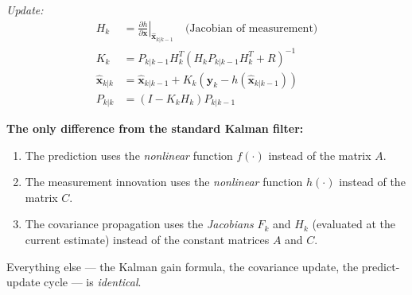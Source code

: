 \textit{Update:}
\begin{align}
H_k &= \left.\frac{\partial h}{\partial \mathbf{x}}\right|_{\hat{\mathbf{x}}_{k|k-1}} \quad \text{(Jacobian of measurement)} \\
K_k &= P_{k|k-1} H_k^T (H_k P_{k|k-1} H_k^T + R)^{-1} \\
\hat{\mathbf{x}}_{k|k} &= \hat{\mathbf{x}}_{k|k-1} + K_k \left(\mathbf{y}_k - h(\hat{\mathbf{x}}_{k|k-1})\right) \\
P_{k|k} &= (I - K_k H_k) P_{k|k-1}
\end{align}

\textbf{The only difference from the standard Kalman filter:}
\begin{enumerate}
    \item The prediction uses the \textit{nonlinear} function $f(\cdot)$ instead of the matrix $A$.
    \item The measurement innovation uses the \textit{nonlinear} function $h(\cdot)$ instead of the matrix $C$.
    \item The covariance propagation uses the \textit{Jacobians} $F_k$ and $H_k$ (evaluated at the current estimate) instead of the constant matrices $A$ and $C$.
\end{enumerate}

Everything else --- the Kalman gain formula, the covariance update, the predict-update cycle --- is \textit{identical}.

